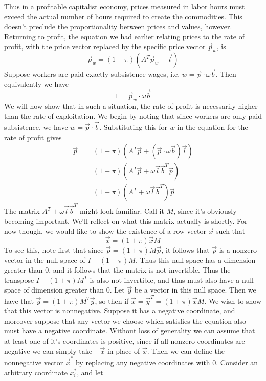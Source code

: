 Thus in a profitable capitalist economy, prices measured in labor hours must exceed the actual number of hours required to create the commodities. This doesn't preclude the proportionality between prices and values, however. Returning to profit, the equation we had earlier relating prices to the rate of profit, with the price vector replaced by the specific price vector $\vec{p}_w$, is
\[ \vec{p}_w = (1+\pi)(A^T\vec{p}_w + \vec{l}) \]
Suppose workers are paid exactly subsistence wages, i.e. $w = \vec{p} \cdot \omega\vec{b}$. Then equivalently we have
\[ 1 = \vec{p}_w \cdot \omega \vec{b} \]
We will now show that in such a situation, the rate of profit is necessarily higher than the rate of exploitation. We begin by noting that since workers are only paid subsistence, we have $w = \vec{p}\cdot\vec{b}$. Substituting this for $w$ in the equation for the rate of profit gives
\begin{align*}
 \vec{p} &= (1+\pi)(A^T\vec{p} + (\vec{p}\cdot \omega\vec{b})\vec{l}) \\
 	&= (1+\pi)(A^T\vec{p} + \omega\vec{l}\vec{b}^T\vec{p}) \\
 	&= (1+\pi)(A^T + \omega\vec{l}\vec{b}^T)\vec{p}
\end{align*} 
The matrix $A^T + \omega\vec{l}\vec{b}^T$ might look familiar. Call it $M$, since it's obviously becoming important. We'll reflect on what this matrix actually is shortly. For now though, we would like to show the existence of a row vector $\vec{x}$ such that 
\[ \vec{x} = (1+\pi)\vec{x}M \]
To see this, note first that since $\vec{p} = (1+\pi)M\vec{p}$, it follows that $\vec{p}$ is a nonzero vector in the null space of $I-(1+\pi)M$. Thus this null space has a dimension greater than $0$, and it follows that the matrix is not invertible. Thus the transpose $I-(1+\pi)M^T$ is also not invertible, and thus must also have a null space of dimension greater than $0$. Let $\vec{y}$ be a vector in this null space. Then we have that $\vec{y} = (1+\pi)M^T\vec{y}$, so then if $\vec{x} = \vec{y}^T = (1+\pi)\vec{x}M$. We wish to show that this vector is nonnegative. Suppose it has a negative coordinate, and moreover suppose that any vector we choose which satisfies the equation also must have a negative coordinate. Without loss of generality we can assume that at least one of it's coordinates is positive, since if all nonzero coordinates are negative we can simply take $-\vec{x}$ in place of $\vec{x}$. Then we can define the nonnegative vector $\vec{x}^*$ by replacing any negative coordinates with $0$. Consider an arbitrary coordinate $x^*_i$, and let 
